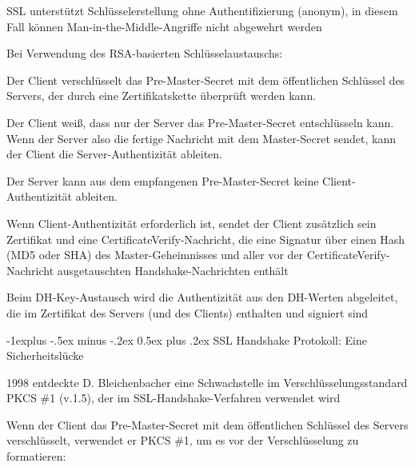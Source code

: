 \documentclass[a4paper]{article}
\makeatletter
\renewcommand{\subsection}{\@startsection{subsection}{2}{0mm}%
 {-1explus -.5ex minus -.2ex}%
 {0.5ex plus .2ex}%
 {\normalfont\normalsize\bfseries}}
\makeatother
\begin{document}
\begin{multicols}{3}
\begin{itemize*}
\begin{itemize*}
                  \begin{itemize*}
                        \item SSL unterstützt Schlüsselerstellung ohne Authentifizierung (anonym), in diesem Fall können Man-in-the-Middle-Angriffe nicht abgewehrt werden
                        \item Bei Verwendung des RSA-basierten Schlüsselaustauschs:
                        \begin{itemize*} \item Der Client verschlüsselt das Pre-Master-Secret mit dem öffentlichen Schlüssel des Servers, der durch eine Zertifikatskette überprüft werden kann. \item Der Client weiß, dass nur der Server das Pre-Master-Secret entschlüsseln kann. Wenn der Server also die fertige Nachricht mit dem Master-Secret sendet, kann der Client die Server-Authentizität ableiten. \item Der Server kann aus dem empfangenen Pre-Master-Secret keine Client-Authentizität ableiten. \item Wenn Client-Authentizität erforderlich ist, sendet der Client zusätzlich sein Zertifikat und eine CertificateVerify-Nachricht, die eine Signatur über einen Hash (MD5 oder SHA) des Master-Geheimnisses und aller vor der CertificateVerify-Nachricht ausgetauschten Handshake-Nachrichten enthält \end{itemize*}
                        \item Beim DH-Key-Austausch wird die Authentizität aus den DH-Werten abgeleitet, die im Zertifikat des Servers (und des Clients) enthalten und signiert sind
                  \end{itemize*}
            \end{itemize*}


            \subsection{SSL Handshake Protokoll: Eine
                  Sicherheitslücke}

            \begin{itemize*}
                  \item
                  1998 entdeckte D. Bleichenbacher eine Schwachstelle im
                  Verschlüsselungsstandard PKCS \#1 (v.1.5), der im
                  SSL-Handshake-Verfahren verwendet wird
                  \item
                  Wenn der Client das Pre-Master-Secret mit dem öffentlichen Schlüssel
                  des Servers verschlüsselt, verwendet er PKCS \#1, um es vor der
                  Verschlüsselung zu formatieren:


\end{itemize*}
\end{itemize*}
\end{multicols}
\end{document}
